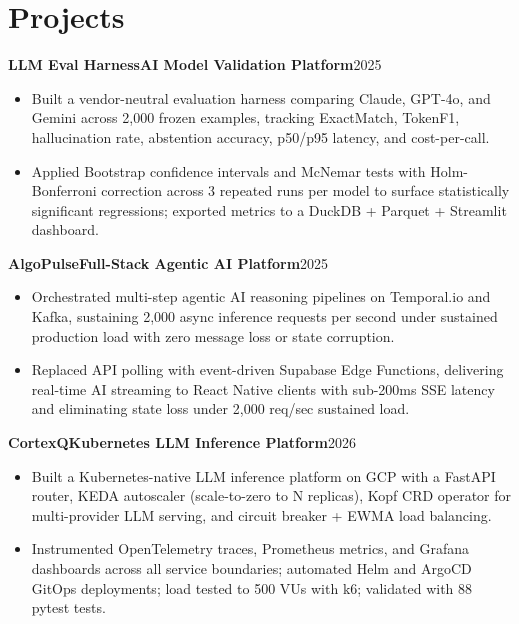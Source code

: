 \documentclass[9pt,letterpaper]{extarticle}
\newcommand{\entry}[3]{%
  \noindent\textbf{#1}\hfill\textbf{#2}\hfill #3%
}
\begin{document}
\section{Projects}

\entry{LLM Eval Harness}{AI Model Validation Platform}{2025}
\begin{itemize}
\item Built a vendor-neutral evaluation harness comparing Claude, GPT-4o, and Gemini across 2,000 frozen examples, tracking ExactMatch, TokenF1, hallucination rate, abstention accuracy, p50/p95 latency, and cost-per-call.
\item Applied Bootstrap confidence intervals and McNemar tests with Holm-Bonferroni correction across 3 repeated runs per model to surface statistically significant regressions; exported metrics to a DuckDB + Parquet + Streamlit dashboard.
\end{itemize}

\vspace{2pt}
\entry{AlgoPulse}{Full-Stack Agentic AI Platform}{2025}
\begin{itemize}
\item Orchestrated multi-step agentic AI reasoning pipelines on Temporal.io and Kafka, sustaining 2,000 async inference requests per second under sustained production load with zero message loss or state corruption.
\item Replaced API polling with event-driven Supabase Edge Functions, delivering real-time AI streaming to React Native clients with sub-200ms SSE latency and eliminating state loss under 2,000 req/sec sustained load.
\end{itemize}

\vspace{2pt}
\entry{CortexQ}{Kubernetes LLM Inference Platform}{2026}
\begin{itemize}
\item Built a Kubernetes-native LLM inference platform on GCP with a FastAPI router, KEDA autoscaler (scale-to-zero to N replicas), Kopf CRD operator for multi-provider LLM serving, and circuit breaker + EWMA load balancing.
\item Instrumented OpenTelemetry traces, Prometheus metrics, and Grafana dashboards across all service boundaries; automated Helm and ArgoCD GitOps deployments; load tested to 500 VUs with k6; validated with 88 pytest tests.
\end{itemize}
\end{document}
